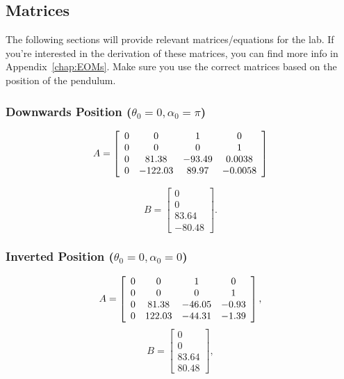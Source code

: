 \subsection{Matrices}\label{section:lab3_prelab}
The following sections will provide relevant matrices/equations for the lab. If you're interested in the derivation of these matrices, you can find more info in Appendix~\ref{chap:EOMs}. Make sure you use the correct matrices based on the position of the pendulum.

\subsubsection*{Downwards Position (\( \theta_0=0, \alpha_0=\pi \))}
\[
    A =
    \left[\begin{array}{c c c c}
            0 & 0       & 1      & 0       \\
            0 & 0       & 0      & 1       \\
            0 & 81.38   & -93.49 & 0.0038  \\
            0 & -122.03 & 89.97  & -0.0058 \\
        \end{array}\right]
\]

\[
    B =
    \left[\begin{array}{c}
            0     \\
            0     \\
            83.64 \\
            -80.48
        \end{array}\right].
\]

\subsubsection*{Inverted Position (\( \theta_0=0, \alpha_0=0 \))}
\[
    A =
    \left[\begin{array}{c c c c}
            0 & 0      & 1      & 0     \\
            0 & 0      & 0      & 1     \\
            0 & 81.38  & -46.05 & -0.93 \\
            0 & 122.03 & -44.31 & -1.39
        \end{array}\right],
\]
\[
    B =
    \left[\begin{array}{c}
            0     \\
            0     \\
            83.64 \\
            80.48
        \end{array}\right],
\]

